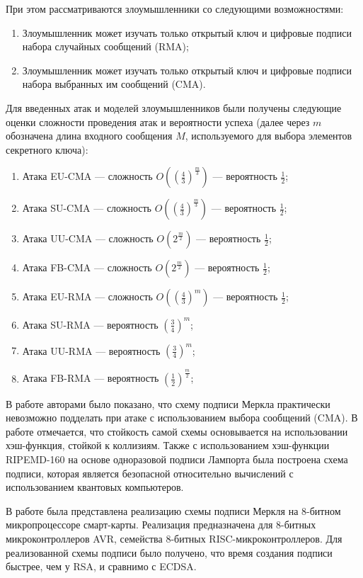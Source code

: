 \documentclass{./civarticle}
\begin{document}
При этом рассматриваются злоумышленники со следующими возможностями:

\begin{enumerate}
    \item Злоумышленник может изучать только открытый ключ и цифровые подписи набора случайных сообщений (RMA);
    \item Злоумышленник может изучать только открытый ключ и цифровые подписи набора выбранных им сообщений (CMA).
\end{enumerate}

Для введенных атак и моделей злоумышленников были получены следующие оценки сложности проведения атак и вероятности успеха (далее через $m$ обозначена длина входного сообщения $M$, используемого для выбора элементов секретного ключа):

\begin{enumerate}
    \item Атака EU-CMA --- сложность $O((\frac{4}{3})^\frac{m}{3})$ --- вероятность $\frac{1}{2}$;
    \item Атака SU-CMA --- сложность $O((\frac{4}{3})^\frac{m}{3})$ --- вероятность $\frac{1}{2}$;
    \item Атака UU-CMA --- сложность $O(2^{\frac{m}{2}})$ --- вероятность $\frac{1}{2}$;
    \item Атака FB-CMA --- сложность $O(2^{\frac{m}{2}})$ --- вероятность $\frac{1}{2}$;
    \item Атака EU-RMA --- сложность $O((\frac{4}{3})^m)$ --- вероятность $\frac{1}{2}$;
    \item Атака SU-RMA --- вероятность $(\frac{3}{4})^m$;
    \item Атака UU-RMA --- вероятность $(\frac{3}{4})^m$;
    \item Атака FB-RMA --- вероятность $(\frac{1}{2})^\frac{m}{2}$;
\end{enumerate}

В работе \cite{merkle1} авторами было показано, что схему подписи Меркла практически невозможно подделать при атаке с использованием выбора сообщений (CMA). В работе отмечается, что стойкость самой схемы основывается на использовании хэш-функция, стойкой к коллизиям. Также с использованием хэш-функции RIPEMD-160 на основе одноразовой подписи Лампорта была построена схема подписи, которая является безопасной относительно вычислений с использованием квантовых компьютеров.

В работе \cite{merkle2} была представлена реализацию схемы подписи Меркля на 8-битном микропроцессоре смарт-карты. Реализация предназначена для 8-битных микроконтроллеров AVR, семейства 8-битных RISC-микроконтроллеров. Для реализованной схемы подписи было получено, что время создания подписи быстрее, чем у RSA, и сравнимо с ECDSA.
\end{document}
